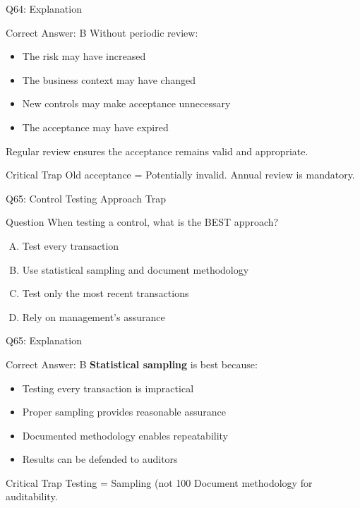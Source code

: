 \documentclass{beamer}
\begin{document}
	\begin{frame}{Q64: Explanation}
		\begin{block}{Correct Answer: B}
			Without periodic review:
			\begin{itemize}
				\item The risk may have increased
				\item The business context may have changed
				\item New controls may make acceptance unnecessary
				\item The acceptance may have expired
			\end{itemize}
			Regular review ensures the acceptance remains valid and appropriate.
		\end{block}
		\begin{alertblock}{Critical Trap}
			Old acceptance = Potentially invalid.
			Annual review is mandatory.
		\end{alertblock}
	\end{frame}
	
	\begin{frame}{Q65: Control Testing Approach Trap}
		\begin{block}{Question}
			When testing a control, what is the BEST approach?
		\end{block}
		\begin{enumerate}[(A)]
			\item Test every transaction
			\item Use statistical sampling and document methodology
			\item Test only the most recent transactions
			\item Rely on management's assurance
		\end{enumerate}
	\end{frame}
	
	\begin{frame}{Q65: Explanation}
		\begin{block}{Correct Answer: B}
			\textbf{Statistical sampling} is best because:
			\begin{itemize}
				\item Testing every transaction is impractical
				\item Proper sampling provides reasonable assurance
				\item Documented methodology enables repeatability
				\item Results can be defended to auditors
			\end{itemize}
		\end{block}
		\begin{alertblock}{Critical Trap}
			Testing = Sampling (not 100%
			Document methodology for auditability.
		\end{alertblock}
	\end{frame}
	
\end{document}
